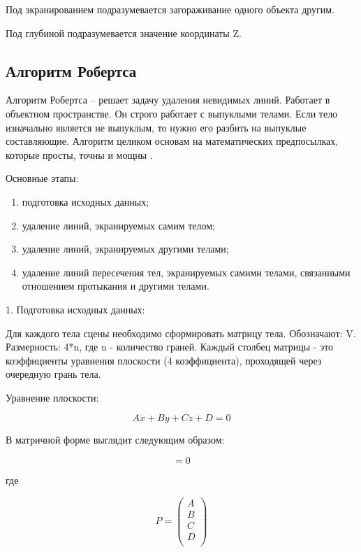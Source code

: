 Под экранированием подразумевается загораживание одного объекта другим.

Под глубиной подразумевается значение координаты Z.

\subsection{Алгоритм Робертса}

Алгоритм Робертса -- решает задачу удаления невидимых линий. Работает в объектном пространстве. Он строго работает с выпуклыми телами. Если тело изначально является не выпуклым, то нужно его разбить на выпуклые составляющие. Алгоритм целиком основам на математических предпосылках, которые просты, точны и мощны \cite{tr1}.

Основные этапы:
\begin{enumerate}
	\item подготовка исходных данных;
	\item удаление линий, экранируемых самим телом;
	\item удаление линий, экранируемых другими телами;
	\item удаление линий пересечения тел, экранируемых самими телами, связанными отношением протыкания и другими телами.
\end{enumerate}

1. Подготовка исходных данных:

Для каждого тела сцены необходимо сформировать матрицу тела. Обозначают: V. Размерность: 4*n, где n - количество граней. Каждый столбец матрицы - это коэффициенты уравнения плоскости (4 коэффициента), проходящей через очередную грань тела.

Уравнение плоскости:

\begin{equation}
	Ax + By + Cz + D = 0
\end{equation}

В матричной форме выглядит следующим образом:

\begin{equation}
	[x\;y\;z\;1][P] = 0
\end{equation}

где

\begin{equation}
	P = \left(
	\begin{array}{c}
			A \\
			B \\
			C \\
			D \\
		\end{array}
	\right)
\end{equation}

